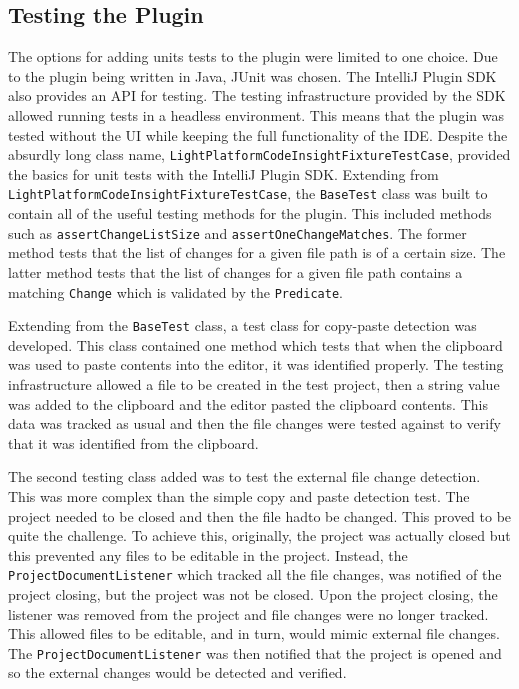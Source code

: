 \subsection{Testing the Plugin}
The options for adding units tests to the plugin were limited to one choice. Due to the plugin being written in Java, JUnit was chosen. The IntelliJ Plugin SDK also provides an API for testing. The testing infrastructure provided by the SDK allowed running tests in a headless environment. This means that the plugin was tested without the UI while keeping the full functionality of the IDE. Despite the absurdly long class name, \texttt{LightPlatformCodeInsightFixtureTestCase}, provided the basics for unit tests with the IntelliJ Plugin SDK. Extending from \texttt{LightPlatformCodeInsightFixtureTestCase}, the \texttt{BaseTest} class was built to contain all of the useful testing methods for the plugin. This included methods such as \texttt{assertChangeListSize} and \texttt{assertOneChangeMatches}. The former method tests that the list of changes for a given file path is of a certain size. The latter method tests that the list of changes for a given file path contains a matching \texttt{Change} which is validated by the \texttt{Predicate}.

Extending from the \texttt{BaseTest} class, a test class for copy-paste detection was developed. This class contained one method which tests that when the clipboard was used to paste contents into the editor, it was identified properly. The testing infrastructure allowed a file to be created in the test project, then a string value was added to the clipboard and the editor pasted the clipboard contents. This data was tracked as usual and then the file changes were tested against to verify that it was identified from the clipboard.

The second testing class added was to test the external file change detection. This was more complex than the simple copy and paste detection test. The project needed to be closed and then the file hadto be changed. This proved to be quite the challenge. To achieve this, originally, the project was actually closed but this prevented any files to be editable in the project. Instead, the \texttt{ProjectDocumentListener} which tracked all the file changes, was notified of the project closing, but the project was not be closed. Upon the project closing, the listener was removed from the project and file changes were no longer tracked. This allowed files to be editable, and in turn, would mimic external file changes. The \texttt{ProjectDocumentListener} was then notified that the project is opened and so the external changes would be detected and verified.


